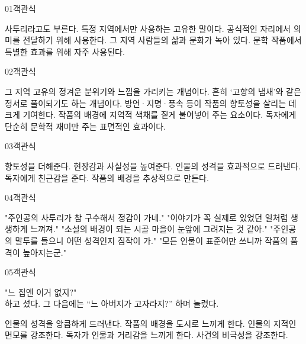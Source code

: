 \documentclass[fs9,seriesRus]{korfarm-base}
\begin{document}
\par\medskip
\kfBeginMC
\begin{kfQBlock}{01}{객관식}
\begin{kfChoices}
\kfChoice 사투리라고도 부른다.
\kfChoice 특정 지역에서만 사용하는 고유한 말이다.
\kfChoice 공식적인 자리에서 의미를 전달하기 위해 사용한다.
\kfChoice 그 지역 사람들의 삶과 문화가 녹아 있다.
\kfChoice 문학 작품에서 특별한 효과를 위해 자주 사용된다.
\end{kfChoices}
\end{kfQBlock}
\begin{kfQBlock}{02}{객관식}
\begin{kfChoices}
\kfChoice 그 지역 고유의 정겨운 분위기와 느낌을 가리키는 개념이다.
\kfChoice 흔히 ‘고향의 냄새’와 같은 정서로 풀이되기도 하는 개념이다.
\kfChoice 방언·지명·풍속 등이 작품의 향토성을 살리는 데 크게 기여한다.
\kfChoice 작품의 배경에 지역적 색채를 짙게 불어넣어 주는 요소이다.
\kfChoice 독자에게 단순히 문학적 재미만 주는 표면적인 효과이다.
\end{kfChoices}
\end{kfQBlock}
\begin{kfQBlock}{03}{객관식}
\begin{kfChoices}
\kfChoice 향토성을 더해준다.
\kfChoice 현장감과 사실성을 높여준다.
\kfChoice 인물의 성격을 효과적으로 드러낸다.
\kfChoice 독자에게 친근감을 준다.
\kfChoice 작품의 배경을 추상적으로 만든다.
\end{kfChoices}
\end{kfQBlock}
\begin{kfQBlock}{04}{객관식}
\begin{kfChoices}
\kfChoice "주인공의 사투리가 참 구수해서 정감이 가네."
\kfChoice "이야기가 꼭 실제로 있었던 일처럼 생생하게 느껴져."
\kfChoice "소설의 배경이 되는 시골 마을이 눈앞에 그려지는 것 같아."
\kfChoice "주인공의 말투를 들으니 어떤 성격인지 짐작이 가."
\kfChoice "모든 인물이 표준어만 쓰니까 작품의 품격이 높아지는군."
\end{kfChoices}
\end{kfQBlock}
\begin{kfQBlock}{05}{객관식}
\begin{kfEvidence}"느 집엔 이거 없지?"   \\\relax
   하고 섰다. 그 다음에는 “느 아버지가 고자라지?” 하며 놀렸다.\end{kfEvidence}
\begin{kfChoices}
\kfChoice 인물의 성격을 앙큼하게 드러낸다.
\kfChoice 작품의 배경을 도시로 느끼게 한다.
\kfChoice 인물의 지적인 면모를 강조한다.
\kfChoice 독자가 인물과 거리감을 느끼게 한다.
\kfChoice 사건의 비극성을 강조한다.
\end{kfChoices}
\end{kfQBlock}
\end{document}
